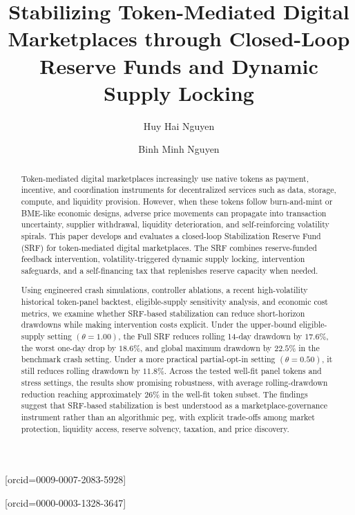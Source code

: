 \documentclass[a4paper,fleqn]{cas-dc}
\begin{document}
\let\WriteBookmarks\relax
\def\floatpagepagefraction{1}
\def\textpagefraction{.001}
\shorttitle{}

\title [mode = title]{Stabilizing Token-Mediated Digital Marketplaces through Closed-Loop Reserve Funds and Dynamic Supply Locking}                      

\author[1]{Huy Hai Nguyen}[orcid=0009-0007-2083-5928]

\author[2]{Binh Minh Nguyen}[orcid=0000-0003-1328-3647]
\cormark[1]



\begin{abstract}
Token-mediated digital marketplaces increasingly use native tokens as payment, incentive, and coordination instruments for decentralized services such as data, storage, compute, and liquidity provision. However, when these tokens follow burn-and-mint or BME-like economic designs, adverse price movements can propagate into transaction uncertainty, supplier withdrawal, liquidity deterioration, and self-reinforcing volatility spirals. This paper develops and evaluates a closed-loop Stabilization Reserve Fund (SRF) for token-mediated digital marketplaces. The SRF combines reserve-funded feedback intervention, volatility-triggered dynamic supply locking, intervention safeguards, and a self-financing tax that replenishes reserve capacity when needed.

Using engineered crash simulations, controller ablations, a recent high-volatility historical token-panel backtest, eligible-supply sensitivity analysis, and economic cost metrics, we examine whether SRF-based stabilization can reduce short-horizon drawdowns while making intervention costs explicit. Under the upper-bound eligible-supply setting \((\theta=1.00)\), the Full SRF reduces rolling 14-day drawdown by \(17.6\%\), the worst one-day drop by \(18.6\%\), and global maximum drawdown by \(22.5\%\) in the benchmark crash setting. Under a more practical partial-opt-in setting \((\theta=0.50)\), it still reduces rolling drawdown by \(11.8\%\). Across the tested well-fit panel tokens and stress settings, the results show promising robustness, with average rolling-drawdown reduction reaching approximately \(26\%\) in the well-fit token subset. The findings suggest that SRF-based stabilization is best understood as a marketplace-governance instrument rather than an algorithmic peg, with explicit trade-offs among market protection, liquidity access, reserve solvency, taxation, and price discovery.
\end{abstract}
\end{document}
